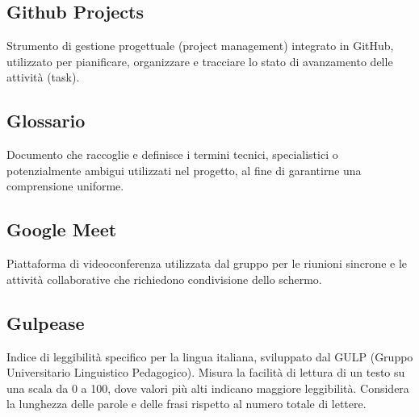 \documentclass[a4paper, 11pt, oneside]{scrartcl} %
\begin{document}
\vspace{0.5cm}

\subsection*{Github Projects}


Strumento di gestione progettuale (project management) integrato in GitHub, utilizzato per pianificare, organizzare e tracciare lo stato di avanzamento delle attività (task).

\vspace{0.5cm}

\subsection*{Glossario}


Documento che raccoglie e definisce i termini tecnici, specialistici o potenzialmente ambigui utilizzati nel progetto, al fine di garantirne una comprensione uniforme.

\vspace{0.5cm}

\subsection*{Google Meet}


Piattaforma di videoconferenza utilizzata dal gruppo per le riunioni sincrone e le attività collaborative che richiedono condivisione dello schermo.

\vspace{0.5cm}

\subsection*{Gulpease}
Indice di leggibilità specifico per la lingua italiana, sviluppato dal GULP (Gruppo Universitario Linguistico Pedagogico). Misura la facilità di lettura di un testo su una scala da 0 a 100, dove valori più alti indicano maggiore leggibilità. Considera la lunghezza delle parole e delle frasi rispetto al numero totale di lettere.
\vspace{0.5cm}
\end{document}
